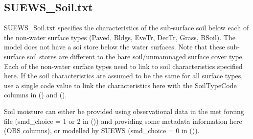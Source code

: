 \documentclass[letterpaper,10pt,english]{sphinxmanual}
\begin{document}
\subsection{SUEWS\_Soil.txt}
\label{\detokenize{input_files/SUEWS_SiteInfo/SUEWS_Soil:suews-soil-txt}}\label{\detokenize{input_files/SUEWS_SiteInfo/SUEWS_Soil::doc}}\label{\detokenize{input_files/SUEWS_SiteInfo/SUEWS_Soil:id1}}
SUEWS\_Soil.txt specifies the characteristics of the sub-surface soil
below each of the non-water surface types (Paved, Bldgs, EveTr, DecTr,
Grass, BSoil). The model does not have a soi store below the water
surfaces. Note that these sub-surface soil stores are different to the
bare soil/unmamnaged surface cover type. Each of the non-water surface
types need to link to soil characteristics specified here. If the soil
characteristics are assumed to be the same for all surface types, use a
single code value to link the characteristics here with the SoilTypeCode
columns in {\hyperref[\detokenize{input_files/SUEWS_SiteInfo/SUEWS_NonVeg:suews-nonveg-txt}]{}} () and {\hyperref[\detokenize{input_files/SUEWS_SiteInfo/SUEWS_Veg:suews-veg-txt}]{}} ().

Soil moisture can either be provided using observational data in the met
forcing file (smd\_choice = 1 or 2 in
{\hyperref[\detokenize{input_files/RunControl/RunControl:runcontrol-nml}]{}} ()) and providing some metadata
information here (OBS columns), or modelled by SUEWS (smd\_choice = 0
in {\hyperref[\detokenize{input_files/RunControl/RunControl:runcontrol-nml}]{}} ()). 
\end{document}
